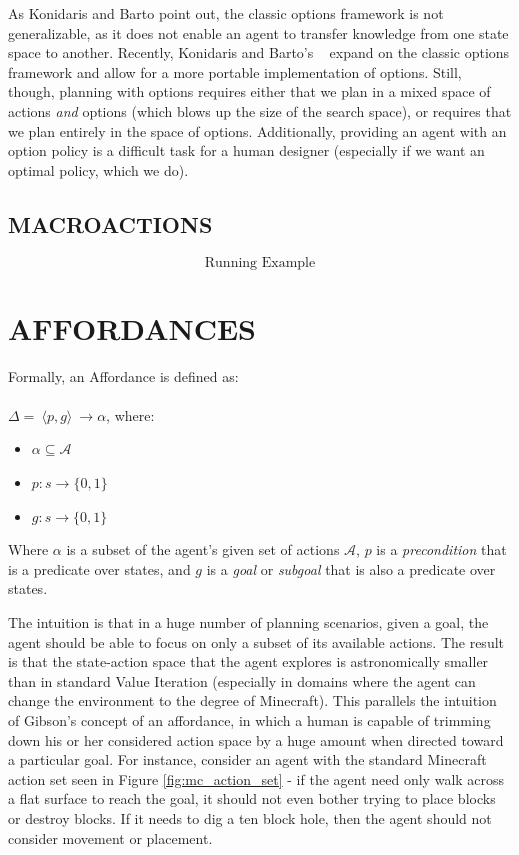 \documentclass[]{article}
\begin{document}
As Konidaris and Barto point out, the classic options framework is not generalizable, as it does not enable an agent to transfer knowledge from one state space to another. Recently, Konidaris and Barto's ~\citep{konidaris} expand on the classic options framework and allow for a more portable implementation of options. Still, though, planning with options requires either that we plan in a mixed space of actions {\it and} options (which blows up the size of the search space), or requires that we plan entirely in the space of options. Additionally, providing an agent with an option policy is a difficult task for a human designer (especially if we want an optimal policy, which we do).

\subsection{MACROACTIONS}

\[
\boxed{\text{Running Example}}
\]

\section{AFFORDANCES}

Formally, an Affordance is defined as: \\ \\
\vspace{1 mm} $\Delta =\ \langle p,g\rangle\ \longrightarrow \alpha$, where:

\begin{itemize}
\item[] $\alpha \subseteq \mathcal{A}$
\item[] $p : s \longrightarrow \{$0$, 1\}$
\item[] $g : s \longrightarrow \{$0$,1\}$
\end{itemize}

Where $\alpha$ is a subset of the agent's given set of actions $\mathcal{A}$, $p$ is a {\it precondition} that is a predicate over states, and $g$ is a {\it goal} or {\it subgoal} that is also a predicate over states.

The intuition is that in a huge number of planning scenarios, given a goal, the agent should be able to focus on only a subset of its available actions. The result is that the state-action space that the agent explores is astronomically smaller than in standard Value Iteration (especially in domains where the agent can change the environment to the degree of Minecraft). This parallels the intuition of Gibson's concept of an affordance, in which a human is capable of trimming down his or her considered action space by a huge amount when directed toward a particular goal. For instance, consider an agent with the standard Minecraft action set seen in Figure \ref{fig:mc_action_set} - if the agent need only walk across a flat surface to reach the goal, it should not even bother trying to place blocks or destroy blocks. If it needs to dig a ten block hole, then the agent should not consider movement or placement.
\end{document}
